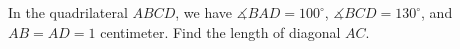 In the quadrilateral $ABCD$,  we have $\measuredangle BAD = 100^{\circ}$,  $\measuredangle BCD = 130^{\circ}$,  and $AB=AD=1$ centimeter. Find the length of diagonal $AC$.